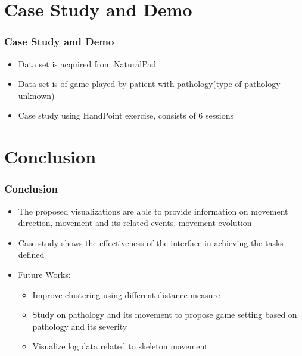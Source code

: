 \documentclass{beamer}
\begin{document}
\section{Case Study and Demo}
\begin{frame}
\frametitle{Case Study and Demo}
\begin{itemize}
\item Data set is acquired from NaturalPad
\item Data set is of game played by patient with pathology(type of pathology unknown)
\item Case study using HandPoint exercise, consists of 6 sessions
\end{itemize}

\end{frame}


\section{Conclusion}
\begin{frame}
\frametitle{Conclusion}
\begin{itemize}
\item The proposed visualizations are able to provide information on movement direction, movement and its related events, movement evolution
\item Case study shows the effectiveness of the interface in achieving the tasks defined
\item Future Works:
\begin{itemize}
\item Improve clustering using different distance measure
\item Study on pathology and its movement to propose game setting based on pathology and its severity
\item Visualize log data related to skeleton movement
\end{itemize}
\end{itemize}
\end{frame}
\end{document}
